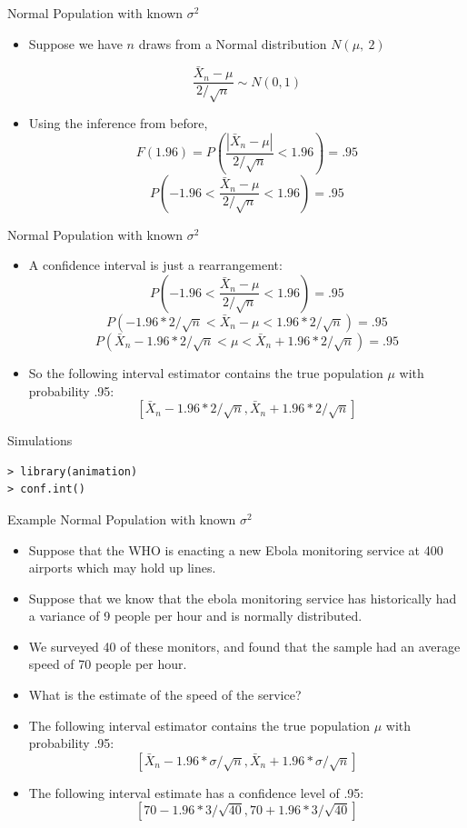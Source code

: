 \documentclass{beamer}
\numberwithin{equation}{section}
\begin{document}
\begin{frame}{Normal Population with known $\sigma^2$}
\begin{itemize}
\item Suppose we have $n$ draws from a Normal distribution $N(\mu,\ 2)$

$$\frac{\bar{X}_n-\mu}{2/\sqrt{n}}\sim N(0,1)$$\pause
\item Using the inference from before,\pause
$$F(1.96)=P(\frac{|\bar{X}_n-\mu|}{2/\sqrt{n}}<1.96)=.95 $$\pause
$$P(-1.96<\frac{\bar{X}_n-\mu}{2/\sqrt{n}}<1.96)=.95$$
\end{itemize}
\end{frame}


\begin{frame}{Normal Population with known $\sigma^2$}
\begin{itemize}
\item A confidence interval is just a rearrangement:
$$P(-1.96<\frac{\bar{X}_n-\mu}{2/\sqrt{n}}<1.96)=.95$$\pause
$$P(-1.96*2/\sqrt{n}<\bar{X}_n-\mu<1.96*2/\sqrt{n})=.95$$\pause
$$P(\bar{X}_n-1.96*2/\sqrt{n}<\mu<\bar{X}_n+1.96*2/\sqrt{n})=.95$$\pause
\item So the following interval estimator contains the true population $\mu$ with probability .95:
$$[\bar{X}_n-1.96*2/\sqrt{n}, \bar{X}_n+1.96*2/\sqrt{n}]$$

\end{itemize}
\end{frame}

\begin{frame}[fragile]{Simulations}
\begin{verbatim}
> library(animation)
> conf.int()
\end{verbatim}
\end{frame}



\begin{frame}{Example Normal Population with known $\sigma^2$}
\begin{itemize}
\item Suppose that the WHO is enacting a new Ebola monitoring service at 400 airports which may hold up lines. \pause
\item Suppose that we know that the ebola monitoring service has historically had a variance of  9 people per hour and is normally distributed. \pause
\item We surveyed 40 of these monitors, and found that the sample had an average speed of 70 people per hour.\pause
\item What is the estimate of the speed of the service?\pause
\item The following interval \alert{estimator} contains the true population $\mu$ with probability .95:
$$[\bar{X}_n-1.96*\sigma/\sqrt{n}, \bar{X}_n+1.96*\sigma/\sqrt{n}]$$\pause
\item The following interval \alert{estimate} has a confidence level of .95:
$$[70-1.96*3/\sqrt{40}, 70+1.96*3/\sqrt{40}]$$

\end{itemize}
\end{frame}
\end{document}
